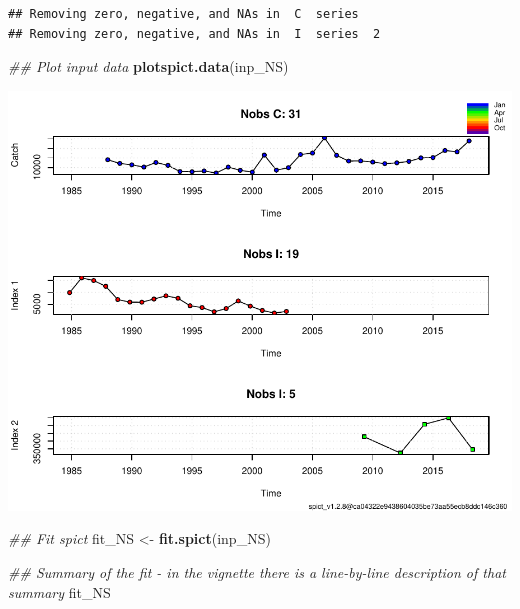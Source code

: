 \documentclass[
]{article}
\newenvironment{Shaded}{\begin{snugshade}}{\end{snugshade}}
\newcommand{\CommentTok}[1]{\textcolor[rgb]{0.56,0.35,0.01}{\textit{#1}}}
\newcommand{\KeywordTok}[1]{\textcolor[rgb]{0.13,0.29,0.53}{\textbf{#1}}}
\newcommand{\NormalTok}[1]{#1}
\newcommand{\StringTok}[1]{\textcolor[rgb]{0.31,0.60,0.02}{#1}}
\begin{document}
\begin{verbatim}
## Removing zero, negative, and NAs in  C  series    
## Removing zero, negative, and NAs in  I  series  2
\end{verbatim}

\begin{Shaded}
\begin{Highlighting}[]
\CommentTok{## Plot input data}
\KeywordTok{plotspict.data}\NormalTok{(inp_NS)}
\end{Highlighting}
\end{Shaded}

\includegraphics{aru.27.123a4_SPiCT_WD_files/figure-latex/fit_scenario2-1.pdf}

\begin{Shaded}
\begin{Highlighting}[]
\CommentTok{## Fit spict}
\NormalTok{fit_NS <-}\StringTok{ }\KeywordTok{fit.spict}\NormalTok{(inp_NS)}

\CommentTok{## Summary of the fit - in the vignette there is a line-by-line description of that summary}
\NormalTok{fit_NS}
\end{Highlighting}
\end{Shaded}
\end{document}
